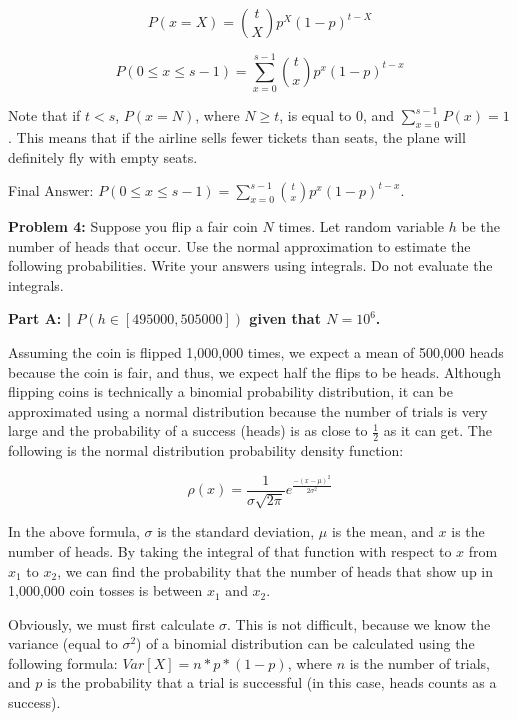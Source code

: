 \documentclass{article}
\begin{document}
 \[P(x=X) = {t \choose X}p^X(1-p)^{t-X}\]
 
 \[P(0 \leq x \leq s-1) = \sum_{x=0}^{s-1}{t \choose x}p^x(1-p)^{t-x}\]
 
 Note that if $t < s$, $P(x=N)$, where $N \geq t$, is equal to 0, and $\sum_{x=0}^{s-1}P(x) = 1$. This means that if the airline sells fewer tickets than seats, the plane will definitely fly with empty seats. \newline
 
 Final Answer: $P(0 \leq x \leq s-1) = \sum_{x=0}^{s-1}{t \choose x}p^x(1-p)^{t-x}$.\newline
 
 \newpage
 
 \begin{center}
    \Large\textbf{Problem 4:} Suppose you flip a fair coin $N$ times. Let random variable $h$
    be the number of heads that occur. Use the normal approximation to estimate the following probabilities. Write your answers using integrals. Do not evaluate the integrals.\par
 \end{center}
 
 \textbf{Part A: | $P(h \in [495000,505000])$ given that $N=10^6$.}\newline
 
 Assuming the coin is flipped 1,000,000 times, we expect a mean of 500,000 heads because the coin is fair, and thus, we expect half the flips to be heads. Although flipping coins is technically a binomial probability distribution, it can be approximated using a normal distribution because the number of trials is very large and the probability of a success (heads) is as close to $\frac{1}{2}$ as it can get. The following is the normal distribution probability density function:
 
 \[\rho(x) = \frac{1}{\sigma\sqrt{2\pi}}e^\frac{-(x-\mu)^2}{2\sigma^2}\]
 
 In the above formula, $\sigma$ is the standard deviation, $\mu$ is the mean, and $x$ is the number of heads. By taking the integral of that function with respect to $x$ from $x_1$ to $x_2$, we can find the probability that the number of heads that show up in 1,000,000 coin tosses is between $x_1$ and $x_2$.
 
 Obviously, we must first calculate $\sigma$. This is not difficult, because we know the variance (equal to $\sigma^2$) of a binomial distribution can be calculated using the following formula: $Var[X] = n*p*(1-p)$, where $n$ is the number of trials, and $p$ is the probability that a trial is successful (in this case, heads counts as a success).
 
\end{document}
